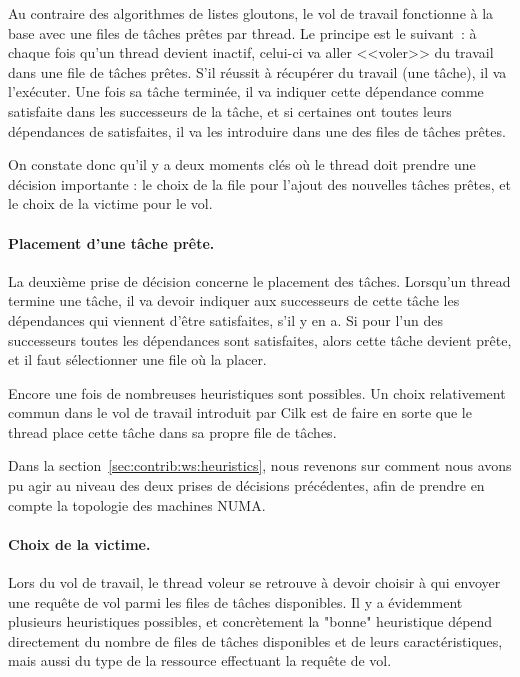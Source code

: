 Au contraire des algorithmes de listes gloutons, le vol de travail fonctionne à la base avec une files de tâches prêtes par thread.
Le principe est le suivant~: à chaque fois qu'un thread devient inactif, celui-ci va aller <<voler>> du travail dans une file de tâches prêtes.
S'il réussit à récupérer du travail (une tâche), il va l'exécuter.
Une fois sa tâche terminée, il va indiquer cette dépendance comme satisfaite dans les successeurs de la tâche, et si certaines ont toutes leurs dépendances de satisfaites, il va les introduire dans une des files de tâches prêtes.

On constate donc qu'il y a deux moments clés où le thread doit prendre une décision importante : le choix de la file pour l'ajout des nouvelles tâches prêtes, et le choix de la victime pour le vol.

\paragraph{Placement d'une tâche prête.}

La deuxième prise de décision concerne le placement des tâches.
Lorsqu'un thread termine une tâche, il va devoir indiquer aux successeurs de cette tâche les dépendances qui viennent d'être satisfaites, s'il y en a.
Si pour l'un des successeurs toutes les dépendances sont satisfaites, alors cette tâche devient prête, et il faut sélectionner une file où la placer.

Encore une fois de nombreuses heuristiques sont possibles. Un choix relativement commun dans le vol de travail introduit par Cilk est de faire en sorte que le thread place cette tâche dans sa propre file de tâches.


Dans la section~\ref{sec:contrib:ws:heuristics}, nous revenons sur comment nous avons pu agir au niveau des deux prises de décisions précédentes, afin de prendre en compte la topologie des machines NUMA.

\paragraph{Choix de la victime.}

Lors du vol de travail, le thread voleur se retrouve à devoir choisir à qui envoyer une requête de vol parmi les files de tâches disponibles.
Il y a évidemment plusieurs heuristiques possibles, et concrètement la "bonne" heuristique dépend directement du nombre de files de tâches disponibles et de leurs caractéristiques, mais aussi du type de la ressource effectuant la requête de vol.

